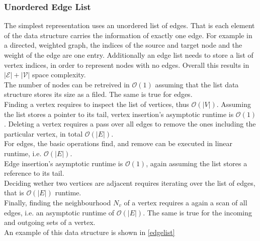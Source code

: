         \subsubsection*{Unordered Edge List}
        The simplest representation uses an unordered list of edges. 
        That is each element of the data structure carries the information of exactly one edge. 
        For example in a directed, weighted graph, the indices of the source and target node and the weight of the edge are one entry. 
        Additionally an edge list needs to store a list of vertex indices, in order to represent nodes with no edges.
        Overall this results in $\mathcal{|E| + |V|}$ space complexity. \\
        
        The number of nodes can be retreived in $\mathcal{O}(1)$ assuming that the list data structure stores its size as a filed. 
        The same is true for edges.\\

        Finding a vertex requires to inspect the list of vertices, thus $\mathcal{O}(|V|)$. 
        Assuming the list stores a pointer to its tail, vertex insertion's asymptotic runtime is $\mathcal{O}(1)$. 
        Deleting a vertex requires a pass over all edges to remove the ones including the particular vertex, in total $\mathcal{O}(|E|)$. \\
        For edges, the basic operations find, and remove can be executed in linear runtime, i.e. $\mathcal{O}(|E|)$. \\
        Edge insertion's asymptotic runtime is $\mathcal{O}(1)$, again assuming the list stores a reference to its tail. \\
        
        Deciding wether two vertices are adjacent requires iterating over the list of edges, that is 
        $\mathcal{O}(|E|)$ runtime.\\
        
        Finally, finding the neighbourhood $N_v$ of a vertex requires a again a scan of all edges, i.e. an asymptotic runtime of $\mathcal{O}(|E|)$. 
        The same is true for the incoming and outgoing sets of a vertex. \\
        
        An example of this data structure is shown in \ref{edgelist}
        
